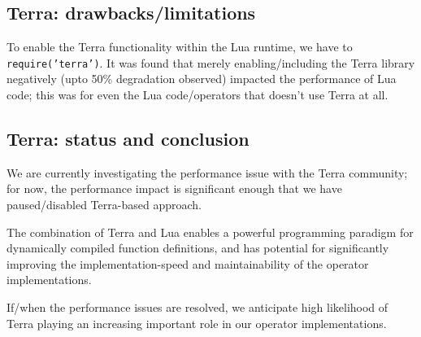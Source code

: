 \subsection{Terra: drawbacks/limitations}
To enable the Terra functionality within the Lua runtime, we have to {\tt require('terra')}. It was found that merely enabling/including the Terra library negatively (upto 50\% degradation observed) impacted the performance of Lua code; this was for even the Lua code/operators that doesn't use Terra at all.

\subsection{Terra: status and conclusion}
We are currently investigating the performance issue with the Terra community; for now, the performance impact is significant enough that we have paused/disabled Terra-based approach.

The combination of Terra and Lua enables a powerful programming paradigm for dynamically compiled function definitions, and has potential for significantly improving the implementation-speed and maintainability of the operator implementations. 

If/when the performance issues are resolved, we anticipate high likelihood of Terra playing an increasing important role in our operator implementations.